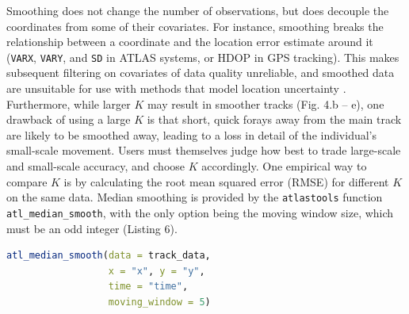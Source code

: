 \documentclass[10pt,paper=a4,headings=standardclasses
]{scrartcl}
\begin{document}
Smoothing does not change the number of observations, but does decouple the coordinates from some of their covariates.
For instance, smoothing breaks the relationship between a coordinate and the location error estimate around it (\texttt{VARX}, \texttt{VARY}, and \texttt{SD} in ATLAS systems, or HDOP in GPS tracking).
This makes subsequent filtering on covariates of data quality unreliable, and smoothed data are unsuitable for use with methods that model location uncertainty \citep{noonan2019, fleming2014a, fleming2020, calabrese2016}.
Furthermore, while larger $K$ may result in smoother tracks (Fig. 4.b -- e), one drawback of using a large $K$ is that short, quick forays away from the main track are likely to be smoothed away, leading to a loss in detail of the individual's small-scale movement.
Users must themselves judge how best to trade large-scale and small-scale accuracy, and choose $K$ accordingly.
One empirical way to compare $K$ is by calculating the root mean squared error (RMSE) for different $K$ on the same data.
Median smoothing is provided by the \texttt{atlastools} function \texttt{atl\_median\_smooth}, with the only option being the moving window size, which must be an odd integer (Listing 6).

\begin{lstlisting}[float, language=R, style=customR, caption = {
    Median smoothing a movement track using the function \texttt{atl\_median\_smooth} function with a moving window \textit{K = 5}. 
    Larger values of $K$ yield smoother tracks, but $K$ should always be some orders of magnitude lower than the number of observations.}]
atl_median_smooth(data = track_data,
                  x = "x", y = "y",
                  time = "time",
                  moving_window = 5)
\end{lstlisting}
\end{document}
